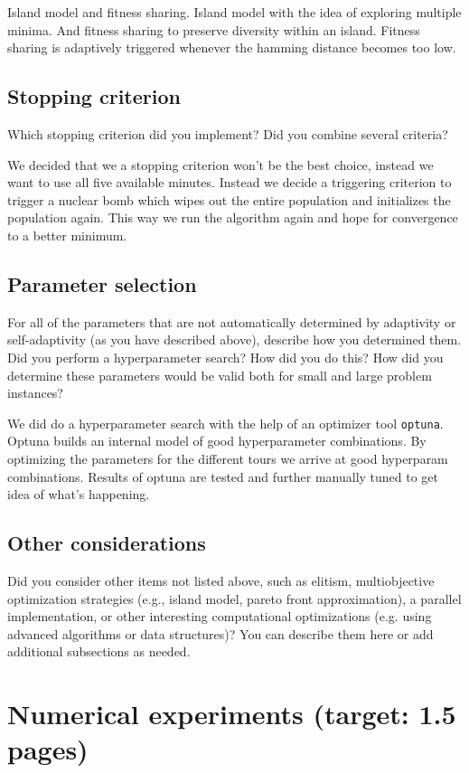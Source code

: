\documentclass[a4paper,10pt]{article}
\newcommand{\ReplaceMe}[1]{{\color{blue}#1}}
\begin{document}
Island model and fitness sharing.
Island model with the idea of exploring multiple minima. And fitness sharing to preserve diversity within an island. Fitness sharing is adaptively triggered whenever the hamming distance becomes too low.
\subsection{Stopping criterion}

\ReplaceMe{Which stopping criterion did you implement? Did you combine several criteria?}

We decided that we a stopping criterion won't be the best choice, instead we want to use all five available minutes. Instead we decide a triggering criterion to trigger a nuclear bomb which wipes out the entire population and initializes the population again. This way we run the algorithm again and hope for convergence to a better minimum.
\subsection{Parameter selection}

\ReplaceMe{For all of the parameters that are not automatically determined by adaptivity or self-adaptivity (as you have described above), describe how you determined them. Did you perform a hyperparameter search? How did you do this? How did you determine these parameters would be valid both for small and large problem instances?}

We did do a hyperparameter search with the help of an optimizer tool \texttt{optuna}. Optuna builds an internal model of good hyperparameter combinations.
By optimizing the parameters for the different tours we arrive at good hyperparam combinations. Results of optuna are tested and further manually tuned to get idea of what's happening.


\subsection{Other considerations}\label{sec_oth}

\ReplaceMe{Did you consider other items not listed above, such as elitism, multiobjective optimization strategies (e.g., island model, pareto front approximation), a parallel implementation, or other interesting computational optimizations (e.g. using advanced algorithms or data structures)? You can describe them here or add additional subsections as needed.}


\section{Numerical experiments \hfill(target: 1.5 pages)}
\end{document}
